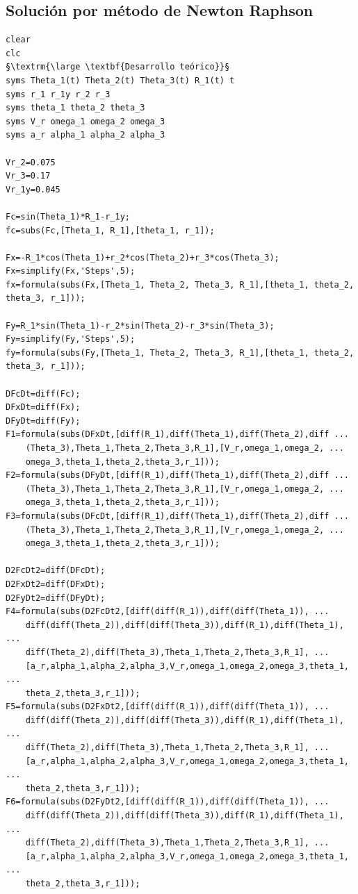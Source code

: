 \documentclass[12pt]{article}
\begin{document}
\subsection{Solución por método de Newton Raphson}
\begin{lstlisting}
clear
clc
§\textrm{\large \textbf{Desarrollo teórico}}§
syms Theta_1(t) Theta_2(t) Theta_3(t) R_1(t) t
syms r_1 r_1y r_2 r_3
syms theta_1 theta_2 theta_3 
syms V_r omega_1 omega_2 omega_3 
syms a_r alpha_1 alpha_2 alpha_3

Vr_2=0.075
Vr_3=0.17
Vr_1y=0.045

Fc=sin(Theta_1)*R_1-r_1y;
fc=subs(Fc,[Theta_1, R_1],[theta_1, r_1]);

Fx=-R_1*cos(Theta_1)+r_2*cos(Theta_2)+r_3*cos(Theta_3);
Fx=simplify(Fx,'Steps',5);
fx=formula(subs(Fx,[Theta_1, Theta_2, Theta_3, R_1],[theta_1, theta_2, theta_3, r_1]));

Fy=R_1*sin(Theta_1)-r_2*sin(Theta_2)-r_3*sin(Theta_3);
Fy=simplify(Fy,'Steps',5);
fy=formula(subs(Fy,[Theta_1, Theta_2, Theta_3, R_1],[theta_1, theta_2, theta_3, r_1]));

DFcDt=diff(Fc);
DFxDt=diff(Fx);
DFyDt=diff(Fy);
F1=formula(subs(DFxDt,[diff(R_1),diff(Theta_1),diff(Theta_2),diff ...
    (Theta_3),Theta_1,Theta_2,Theta_3,R_1],[V_r,omega_1,omega_2, ...
    omega_3,theta_1,theta_2,theta_3,r_1]));
F2=formula(subs(DFyDt,[diff(R_1),diff(Theta_1),diff(Theta_2),diff ...
    (Theta_3),Theta_1,Theta_2,Theta_3,R_1],[V_r,omega_1,omega_2, ...
    omega_3,theta_1,theta_2,theta_3,r_1]));
F3=formula(subs(DFcDt,[diff(R_1),diff(Theta_1),diff(Theta_2),diff ...
    (Theta_3),Theta_1,Theta_2,Theta_3,R_1],[V_r,omega_1,omega_2, ...
    omega_3,theta_1,theta_2,theta_3,r_1]));

D2FcDt2=diff(DFcDt);
D2FxDt2=diff(DFxDt);
D2FyDt2=diff(DFyDt);
F4=formula(subs(D2FcDt2,[diff(diff(R_1)),diff(diff(Theta_1)), ...
    diff(diff(Theta_2)),diff(diff(Theta_3)),diff(R_1),diff(Theta_1), ...
    diff(Theta_2),diff(Theta_3),Theta_1,Theta_2,Theta_3,R_1], ...
    [a_r,alpha_1,alpha_2,alpha_3,V_r,omega_1,omega_2,omega_3,theta_1, ...
    theta_2,theta_3,r_1]));
F5=formula(subs(D2FxDt2,[diff(diff(R_1)),diff(diff(Theta_1)), ...
    diff(diff(Theta_2)),diff(diff(Theta_3)),diff(R_1),diff(Theta_1), ...
    diff(Theta_2),diff(Theta_3),Theta_1,Theta_2,Theta_3,R_1], ...
    [a_r,alpha_1,alpha_2,alpha_3,V_r,omega_1,omega_2,omega_3,theta_1, ...
    theta_2,theta_3,r_1]));
F6=formula(subs(D2FyDt2,[diff(diff(R_1)),diff(diff(Theta_1)), ...
    diff(diff(Theta_2)),diff(diff(Theta_3)),diff(R_1),diff(Theta_1), ...
    diff(Theta_2),diff(Theta_3),Theta_1,Theta_2,Theta_3,R_1], ...
    [a_r,alpha_1,alpha_2,alpha_3,V_r,omega_1,omega_2,omega_3,theta_1, ...
    theta_2,theta_3,r_1]));


\end{lstlisting}
\end{document}
